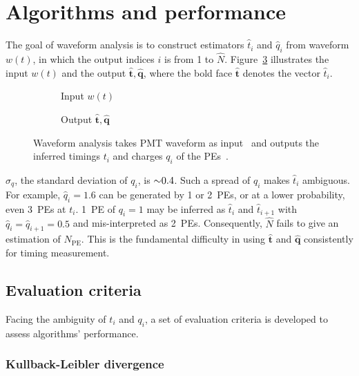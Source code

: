 \section{Algorithms and performance}
\label{sec:algorithm}

The goal of waveform analysis is to construct estimators $\hat{t}_i$ and $\hat{q}_i$ from waveform $w(t)$, in which the output indices $i$ is from 1 to $\hat{N}$.  Figure~\ref{fig:io} illustrates the input $w(t)$ and the output $\bm{\hat{t}}, \bm{\hat{q}}$, where the bold face $\bm{\hat{t}}$ denotes the vector $\hat{t}_i$. 
\begin{figure}[H]
  \centering
  \begin{subfigure}{.45\textwidth}
    \resizebox{\textwidth}{!}{}
    \caption{\label{fig:input} Input $w(t)$}
  \end{subfigure}
  \begin{subfigure}{.45\textwidth}
    \resizebox{\textwidth}{!}{}
    \caption{\label{fig:output} Output $\bm{\hat{t}}, \bm{\hat{q}}$}
  \end{subfigure}
  \caption{\label{fig:io}Waveform analysis takes PMT waveform as input~ and outputs the inferred timings $t_i$ and charges $q_i$ of the PEs~.}
\end{figure}

$\sigma_q$, the standard deviation of $q_i$, is $\num{\sim 0.4}$.  Such a spread of $q_i$ makes $\hat{t}_i$ ambiguous. For example, $\hat{q}_i=1.6$ can be generated by 1 or 2~PEs, or at a lower probability, even 3~PEs at $t_i$. 1~PE of $q_i=1$ may be inferred as $\hat{t}_i$ and $\hat{t}_{i+1}$ with $\hat{q}_i=\hat{q}_{i+1}=0.5$ and mis-interpreted as 2~PEs.  Consequently, $\hat{N}$ fails to give an estimation of $N_\mathrm{PE}$.  This is the fundamental difficulty in using $\bm{\hat{t}}$ and $\bm{\hat{q}}$ consistently for timing measurement. 

\subsection{Evaluation criteria}
\label{sec:criteria}
Facing the ambiguity of $t_i$ and $q_i$, a set of evaluation criteria is developed to assess algorithms' performance. 

\subsubsection{Kullback-Leibler divergence}
\label{sec:pseudo}

